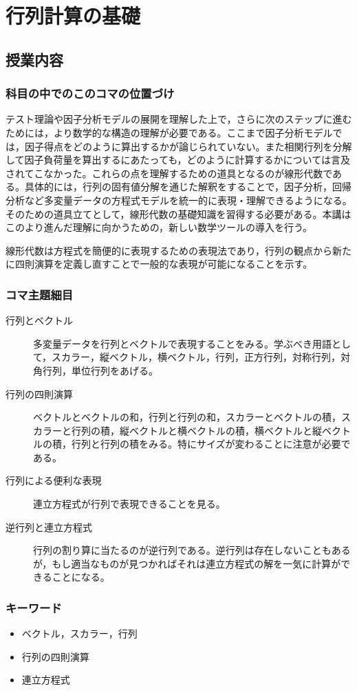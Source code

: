 \section{行列計算の基礎}
\subsection{授業内容}
\subsubsection{科目の中でのこのコマの位置づけ}
テスト理論や因子分析モデルの展開を理解した上で，さらに次のステップに進むためには，より数学的な構造の理解が必要である。ここまで因子分析モデルでは，因子得点をどのように算出するかが論じられていない。また相関行列を分解して因子負荷量を算出するにあたっても，どのように計算するかについては言及されてこなかった。これらの点を理解するための道具となるのが線形代数である。具体的には，行列の固有値分解を通じた解釈をすることで，因子分析，回帰分析など多変量データの方程式モデルを統一的に表現・理解できるようになる。そのための道具立てとして，線形代数の基礎知識を習得する必要がある。本講はこのより進んだ理解に向かうための，新しい数学ツールの導入を行う。

線形代数は方程式を簡便的に表現するための表現法であり，行列の観点から新たに四則演算を定義し直すことで一般的な表現が可能になることを示す。

\subsubsection{コマ主題細目}
\begin{description}
    \item[行列とベクトル] 多変量データを行列とベクトルで表現することをみる。学ぶべき用語として，スカラー，縦ベクトル，横ベクトル，行列，正方行列，対称行列，対角行列，単位行列をあげる。
    \item[行列の四則演算] ベクトルとベクトルの和，行列と行列の和，スカラーとベクトルの積，スカラーと行列の積，縦ベクトルと横ベクトルの積，横ベクトルと縦ベクトルの積，行列と行列の積をみる。特にサイズが変わることに注意が必要である。
    \item[行列による便利な表現] 連立方程式が行列で表現できることを見る。
    \item[逆行列と連立方程式] 行列の割り算に当たるのが逆行列である。逆行列は存在しないこともあるが，もし適当なものが見つかればそれは連立方程式の解を一気に計算ができることになる。
\end{description}
\subsubsection{キーワード}
\begin{itemize}
\item ベクトル，スカラー，行列
\item 行列の四則演算
\item 連立方程式
\end{itemize}
